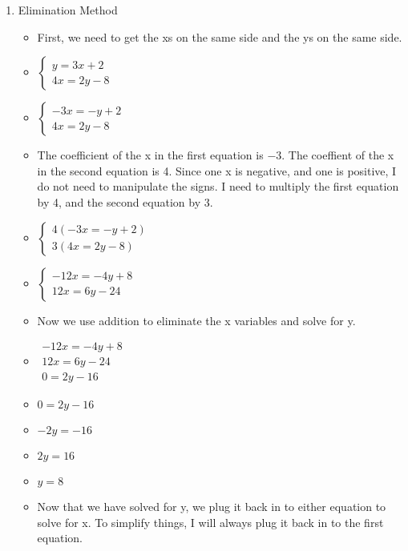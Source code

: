 \documentclass{article}
\begin{document}
\begin{enumerate}
\begin{enumerate}
\begin{itemize}
    \end{itemize}
  \item Elimination Method
    \begin{itemize}
    \item First, we need to get the xs on the same side and the ys on the same side.
    \item []  $\left\{ \begin{array}{l}
              y=3x+2 \\
              4x=2y-8 \end{array} \right.$
    \item []  $\left\{ \begin{array}{l}
              -3x=-y+2 \\
              4x=2y-8 \end{array} \right.$
    \item The coefficient of the x in the first equation is $-3$. The coeffient of the x in the second equation is 4. Since one x is negative, and one is positive, I do not need to manipulate the signs. I need to multiply the first equation by 4, and the second equation by 3.
    \item []  $\left\{ \begin{array}{l}
              4(-3x=-y+2) \\
              3(4x=2y-8) \end{array} \right.$
    \item []  $\left\{ \begin{array}{l}
              -12x=-4y+8 \\
              12x=6y-24 \end{array} \right.$
    \item Now we use addition to eliminate the x variables and solve for y.
    \item []  $\begin{array}{l}
              -12x=-4y+8 \\
              12x=6y-24\\ \hline
              0=2y-16 \end{array}$
    \item []  $0=2y-16$
    \item []  $-2y=-16$
    \item []  $2y=16$
    \item []  $y=8$
    \item Now that we have solved for y, we plug it back in to either equation to solve for x. To simplify things, I will always plug it back in to the first equation.

\end{itemize}
\end{enumerate}
\end{enumerate}
\end{document}

